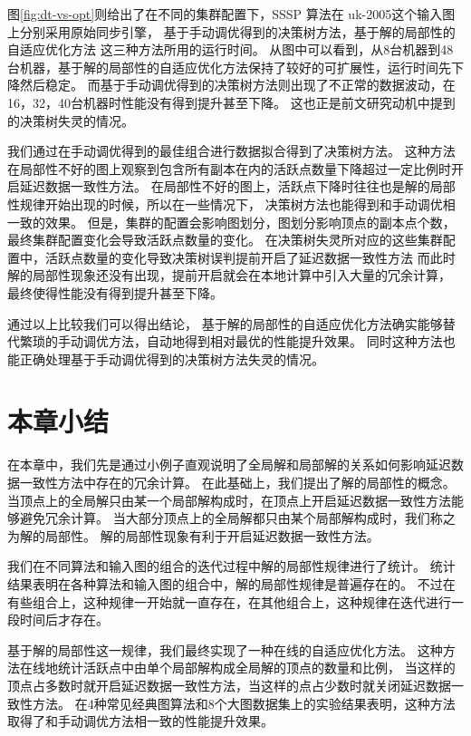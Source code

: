 图\ref{fig:dt-vs-opt}则给出了在不同的集群配置下，SSSP 算法在 uk-2005这个输入图上分别采用原始同步引擎，
基于手动调优得到的决策树方法，基于解的局部性的自适应优化方法 这三种方法所用的运行时间。
从图中可以看到，从8台机器到48台机器，基于解的局部性的自适应优化方法保持了较好的可扩展性，运行时间先下降然后稳定。
而基于手动调优得到的决策树方法则出现了不正常的数据波动，在16，32，40台机器时性能没有得到提升甚至下降。
这也正是前文研究动机中提到的决策树失灵的情况。

我们通过在手动调优得到的最佳组合进行数据拟合得到了决策树方法。
这种方法在局部性不好的图上观察到包含所有副本在内的活跃点数量下降超过一定比例时开启延迟数据一致性方法。
在局部性不好的图上，活跃点下降时往往也是解的局部性规律开始出现的时候，所以在一些情况下，
决策树方法也能得到和手动调优相一致的效果。
但是，集群的配置会影响图划分，图划分影响顶点的副本点个数，最终集群配置变化会导致活跃点数量的变化。
在决策树失灵所对应的这些集群配置中，活跃点数量的变化导致决策树误判提前开启了延迟数据一致性方法
而此时解的局部性现象还没有出现，提前开启就会在本地计算中引入大量的冗余计算，
最终使得性能没有得到提升甚至下降。

  
通过以上比较我们可以得出结论，
基于解的局部性的自适应优化方法确实能够替代繁琐的手动调优方法，自动地得到相对最优的性能提升效果。
同时这种方法也能正确处理基于手动调优得到的决策树方法失灵的情况。


\section{本章小结}
在本章中，我们先是通过小例子直观说明了全局解和局部解的关系如何影响延迟数据一致性方法中存在的冗余计算。
在此基础上，我们提出了解的局部性的概念。
当顶点上的全局解只由某一个局部解构成时，在顶点上开启延迟数据一致性方法能够避免冗余计算。
当大部分顶点上的全局解都只由某个局部解构成时，我们称之为解的局部性。
解的局部性现象有利于开启延迟数据一致性方法。

我们在不同算法和输入图的组合的迭代过程中解的局部性规律进行了统计。
统计结果表明在各种算法和输入图的组合中，解的局部性规律是普遍存在的。
不过在有些组合上，这种规律一开始就一直存在，在其他组合上，这种规律在迭代进行一段时间后才存在。

基于解的局部性这一规律，我们最终实现了一种在线的自适应优化方法。
这种方法在线地统计活跃点中由单个局部解构成全局解的顶点的数量和比例，
当这样的顶点占多数时就开启延迟数据一致性方法，当这样的点占少数时就关闭延迟数据一致性方法。
在4种常见经典图算法和8个大图数据集上的实验结果表明，这种方法取得了和手动调优方法相一致的性能提升效果。
